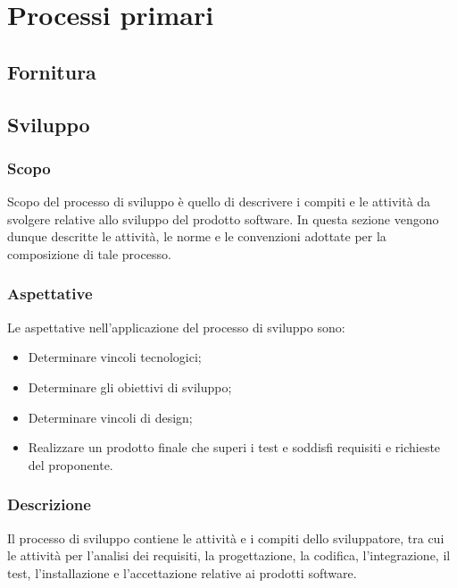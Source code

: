 \setcounter{secnumdepth}{5}
\makeatletter
\renewcommand\subparagraph{
\@startsection {subparagraph}{5}{0mm}{-\baselineskip}{.5\baselineskip}{\normalfont \normalsize \bfseries }}
\makeatother

\section{Processi primari}\label{section:Processi_primari}
\subsection{Fornitura} \label{subsection:Fornitura}

\subsection{Sviluppo} \label{subsection:Sviluppo}
    \subsubsection{Scopo} \label{subsubsection:Scopo}
    Scopo del processo di sviluppo è quello di descrivere i compiti e le attività da svolgere relative allo sviluppo del prodotto software.
    In questa sezione vengono dunque descritte le attività, le norme e le convenzioni adottate per la composizione di tale processo.

    \subsubsection{Aspettative} \label{subsubsection:Aspettative}
    Le aspettative nell’applicazione del processo di sviluppo sono:
    \begin{itemize}
        \item Determinare vincoli tecnologici;
        \item Determinare gli obiettivi di sviluppo;
        \item Determinare vincoli di design;
        \item Realizzare un prodotto finale che superi i test e soddisfi requisiti e richieste del proponente.
    \end{itemize}

    \subsubsection{Descrizione} \label{subsubsection:Descrizione}
    Il processo di sviluppo contiene le attività e i compiti dello sviluppatore, tra cui le attività per l’analisi dei requisiti, la progettazione, 
    la codifica, l’integrazione, il test, l’installazione e l’accettazione relative ai prodotti software.

